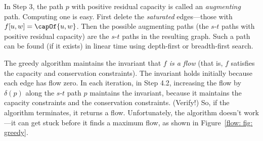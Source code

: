 In Step 3, the path $p$ with positive residual capacity is called an \emph{augmenting} path.
Computing one is easy. First delete the \emph{saturated} edges---those with $f[u,w] = \capOf{u,w}$.
Then the possible augmenting paths (the $s$-$t$ paths with positive residual capacity)
are the $s$-$t$ paths in the resulting graph.
Such a path can be found (if it exists) in linear time
using depth-first or breadth-first search.

The greedy algorithm maintains the invariant that \emph{$f$ is a flow}
(that is, $f$ satisfies the capacity and conservation constraints).
The invariant holds initially because each edge has flow zero.
In each iteration, in Step 4.2, increasing the flow by $\delta(p)$
along the $s$-$t$ path $p$ maintains the invariant,
because it maintains the capacity constraints and the conservation constraints.
(Verify!)
So, if the algorithm terminates, it returns a flow.
Unfortunately, the algorithm doesn't work---it can get stuck before it finds a maximum flow,
as shown in Figure~\ref{flow: fig: greedy}.

